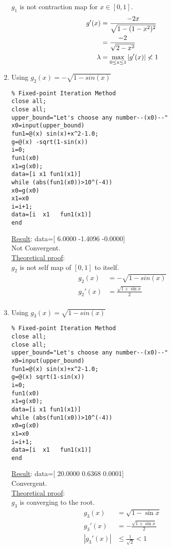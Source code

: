 \documentclass{article}
\begin{document}
\begin{enumerate}
\begin{enumerate}
$g_1$ is not contraction map for $x\in[0,1]$.
\begin{align}
    g'(x)&=\frac{-2x}{\sqrt{1-(1-x^2)^2}}\\
    &=\frac{-2}{\sqrt{2-x^2}}\\
    \lambda &=\max_{\operatornamewithlimits{0 \le x \le 1}}|g'(x)|\nless1
\end{align}
    \item Using $g_2(x) =-\sqrt{1-sin(x)}$
    \begin{lstlisting}
% Fixed-point Iteration Method
close all;
close all;
upper_bound="Let's choose any number--(x0)--"
x0=input(upper_bound)
fun1=@(x) sin(x)+x^2-1.0;
g=@(x) -sqrt(1-sin(x))
i=0;
fun1(x0)
x1=g(x0);
data=[i x1 fun1(x1)]
while (abs(fun1(x0))>10^(-4))
x0=g(x0)
x1=x0
i=i+1;
data=[i  x1   fun1(x1)]
end
    \end{lstlisting}
  \underline{Result}: data=[  6.0000   -1.4096   -0.0000]\\
Not Convergent. \\
\underline{Theoretical proof}:\\
$g_2$ is not self map of $[0,1]$ to itself.
\begin{align}
     g_2(x) &=-\sqrt{1-sin(x)}\\
     g_2'(x)&=\frac{\sqrt{1+\sin{x}}}{2}\\
\end{align}

   \item Using $g_3(x) =\sqrt{1-sin(x)}$
    \begin{lstlisting}
% Fixed-point Iteration Method
close all;
close all;
upper_bound="Let's choose any number--(x0)--"
x0=input(upper_bound)
fun1=@(x) sin(x)+x^2-1.0;
g=@(x) sqrt(1-sin(x))
i=0;
fun1(x0)
x1=g(x0);
data=[i x1 fun1(x1)]
while (abs(fun1(x0))>10^(-4))
x0=g(x0)
x1=x0
i=i+1;
data=[i  x1   fun1(x1)]
end  
    \end{lstlisting}
 \underline{Result}: data=[ 20.0000    0.6368    0.0001]\\
 Convergent.\\
\underline{Theoretical proof}:\\
$g_3$ is converging to the root.
\begin{align}
    g_3(x)&=\sqrt{1-\sin{x}}\\
    g_3'(x)&=-\frac{\sqrt{1+\sin{x}}}{2}\\
    |g_3'(x)|&\le\frac{1}{\sqrt{2}}<1
\end{align}
\end{enumerate}
\end{enumerate}
\end{document}
